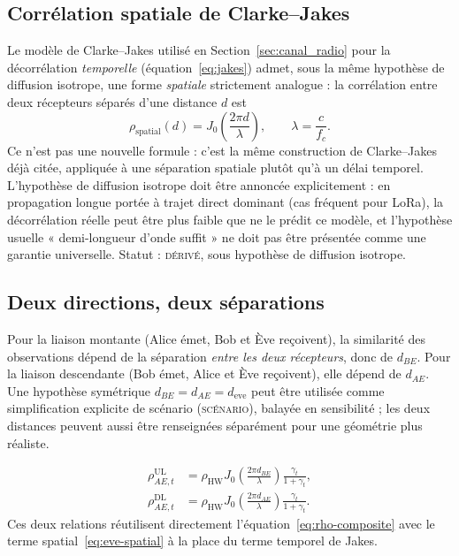 \documentclass[conference,a4paper]{IEEEtran}
\newcommand{\statusDer}{\textsc{dérivé}}
\newcommand{\statusScen}{\textsc{scénario}}
\begin{document}
\subsection{Corrélation spatiale de Clarke--Jakes}
Le modèle de Clarke--Jakes utilisé en Section~\ref{sec:canal_radio} pour la décorrélation \emph{temporelle} (équation~\eqref{eq:jakes}) admet, sous la même hypothèse de diffusion isotrope, une forme \emph{spatiale} strictement analogue : la corrélation entre deux récepteurs séparés d'une distance $d$ est
\begin{equation}
    \rho_{\mathrm{spatial}}(d)=J_0\!\left(\frac{2\pi d}{\lambda}\right),
    \qquad \lambda=\frac{c}{f_c}.
    \label{eq:eve-spatial}
\end{equation}
Ce n'est pas une nouvelle formule : c'est la même construction de Clarke--Jakes déjà citée, appliquée à une séparation spatiale plutôt qu'à un délai temporel. L'hypothèse de diffusion isotrope doit être annoncée explicitement : en propagation longue portée à trajet direct dominant (cas fréquent pour LoRa), la décorrélation réelle peut être plus faible que ne le prédit ce modèle, et l'hypothèse usuelle « demi-longueur d'onde suffit » ne doit pas être présentée comme une garantie universelle. Statut : \statusDer{}, sous hypothèse de diffusion isotrope.

\subsection{Deux directions, deux séparations}
Pour la liaison montante (Alice émet, Bob et Ève reçoivent), la similarité des observations dépend de la séparation \emph{entre les deux récepteurs}, donc de $d_{BE}$. Pour la liaison descendante (Bob émet, Alice et Ève reçoivent), elle dépend de $d_{AE}$. Une hypothèse symétrique $d_{BE}=d_{AE}=d_{\mathrm{eve}}$ peut être utilisée comme simplification explicite de scénario (\statusScen{}), balayée en sensibilité ; les deux distances peuvent aussi être renseignées séparément pour une géométrie plus réaliste.

\begin{align}
    \rho_{AE,t}^{\mathrm{UL}}&=\rho_{\mathrm{HW}}J_0\!\left(\frac{2\pi d_{BE}}{\lambda}\right)\frac{\gamma_t}{1+\gamma_t},
    \label{eq:eve-rho-ul}\\
    \rho_{AE,t}^{\mathrm{DL}}&=\rho_{\mathrm{HW}}J_0\!\left(\frac{2\pi d_{AE}}{\lambda}\right)\frac{\gamma_t}{1+\gamma_t}.
    \label{eq:eve-rho-dl}
\end{align}
Ces deux relations réutilisent directement l'équation~\eqref{eq:rho-composite} avec le terme spatial~\eqref{eq:eve-spatial} à la place du terme temporel de Jakes.
\end{document}
